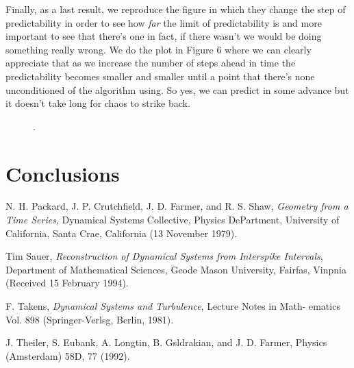 \documentclass[10pt]{article}
\begin{document}
Finally, as a last result, we reproduce the figure in which they change the step of predictability in order to see how \textit{far} the limit of predictability is and more important to see that there's one in fact, if there wasn't we would be doing something really wrong. We do the plot in Figure 6 where we can clearly appreciate that as we increase the number of steps ahead in time the predictability becomes smaller and smaller until a point that there's none unconditioned of the algorithm using. So yes, we can predict in some advance but it doesn't take long for chaos to strike back.

\begin{figure}[h!]
\centering
\caption{.}
\label{fig:distributions}
\end{figure}

\section{Conclusions}

\begin{thebibliography}{99}
 
N. H. Packard, J. P. Crutchfield, J. D. Farmer, and R. S. Shaw, {\it Geometry from a Time Series}, Dynamical Systems Collective, Physics DePartment, University of California, Santa Crae, California (13 November 1979).

Tim Sauer, {\it Reconstruction of Dynamical Systems from Interspike Intervals}, Department of Mathematical Sciences, Geode Mason University, Fairfas, Vinpnia (Received 15 February 1994).

F. Takens, {\it Dynamical Systems and Turbulence}, Lecture Notes in Math-
ematics Vol. 898 (Springer-Verlsg, Berlin, 1981).

J. Theiler, S. Eubank, A. Longtin, B. Gsldrakian, and
J. D. Farmer, Physics (Amsterdam) 58D, 77 (1992).

\end{thebibliography}
\end{document}

